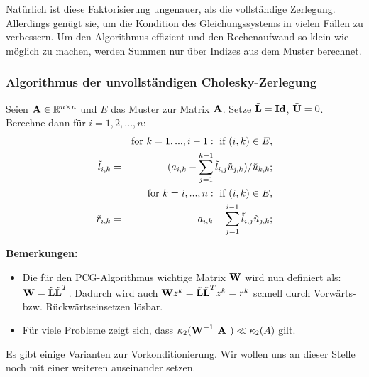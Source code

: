 Natürlich ist diese Faktorisierung ungenauer, als die vollständige Zerlegung. Allerdings genügt sie, um die Kondition des Gleichungssystems in vielen Fällen zu verbessern. Um den Algorithmus effizient und den Rechenaufwand so klein wie möglich zu machen, werden Summen nur über Indizes aus dem Muster berechnet.

\subsubsection{Algorithmus der unvollständigen Cholesky-Zerlegung}\label{sss.Cholesky-Algorithmus}

Seien ${\textbf{A}} \in \mathbb{R}^{n \times n}$ und $E$ das Muster zur Matrix ${\textbf{A}}$. Setze $\tilde{{\textbf{L}}} = {\textbf{Id}}$, $\tilde{{\textbf{U}}} = 0$. Berechne dann für $i=1,2,...,n$:
\begin{eqnarray}
&&\textnormal{for } k = 1,...,i-1: \textnormal{ if } (i,k) \in E,\notag \\
\tilde l_{i,k} &=& (a_{i,k} - \sum_{j=1}^{k-1} \tilde l_{i,j} \tilde u_{j,k})/ \tilde u_{k,k}; \notag \\
&&\textnormal{for } k = i,...,n: \textnormal{ if } (i,k) \in E, \notag \\
\tilde r_{i,k} &=& a_{i,k} - \sum_{j=1}^{i-1} \tilde l_{i,j} \tilde u_{j,k}; \notag
\end{eqnarray}

\textbf{Bemerkungen:}

\begin{itemize}
\item Die für den PCG-Algorithmus wichtige Matrix ${\textbf{W}}$ wird nun definiert als: ${\textbf{W}} = \tilde{{\textbf{L}}} \tilde{{\textbf{L}}}^{T}$. Dadurch wird auch ${\textbf{W}}z^{k} = \tilde{{\textbf{L}}} \tilde{{\textbf{L}}}^{T}z^{k} = r^{k}$ schnell durch Vorwärts- bzw. Rückwärtseinsetzen lösbar.
\item Für viele Probleme zeigt sich, dass $\kappa_{2}({\textbf{W}}^{-1} {\textbf{ {\textbf{A}} }}) \ll \kappa_{2} (A)$ gilt. \\
\end{itemize}

Es gibt einige Varianten zur Vorkonditionierung. Wir wollen uns an dieser Stelle noch mit einer weiteren auseinander setzen.

